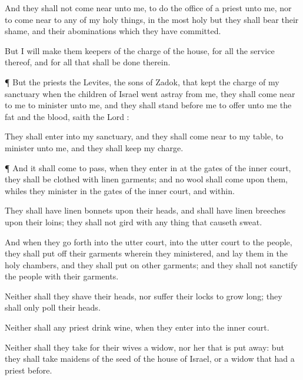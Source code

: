 {And they shall not come
near unto me, to do the office of a
priest unto me, nor to come
near to any of my holy
things, in the most
holy
{} but they shall
bear their
shame, and their
abominations which they have
committed.

But I will
make them
keepers of the
charge of the
house, for all the
service thereof, and for all that shall be
done therein.


\par }{\PP {}¶ But the
priests the
Levites, the
sons of
Zadok, that
kept the
charge of my
sanctuary when the
children of
Israel went
astray from me, they shall come
near to me to
minister unto me, and they shall
stand
before me to
offer unto me the
fat and the
blood,
saith the
Lord
{}:

They shall
enter into my
sanctuary, and they shall come
near to my
table, to
minister unto me, and they shall
keep my
charge.


\par }{\PP {}¶ And it shall come to pass,
{} when they
enter in at the
gates of the
inner
court, they shall be
clothed with
linen
garments; and no
wool shall
come upon them, whiles they
minister in the
gates of the
inner
court, and
within.

They shall have
linen
bonnets upon their
heads, and shall have
linen
breeches upon their
loins; they shall not
gird
{} with any thing that causeth
sweat.

And when they go
forth into the
utter
court,
{} into the
utter
court to the
people, they shall put
off their
garments wherein they
ministered, and
lay them in the
holy
chambers, and they shall
put on
other
garments; and they shall not
sanctify the
people with their
garments.

Neither shall they
shave their
heads, nor suffer their
locks to grow
long; they shall
only
poll their
heads.

Neither shall any
priest
drink
wine, when they
enter into the
inner
court.

Neither shall they
take for their
wives a
widow, nor her that is put
away: but they shall
take
maidens of the
seed of the
house of
Israel, or a
widow that had a
priest before.

}
